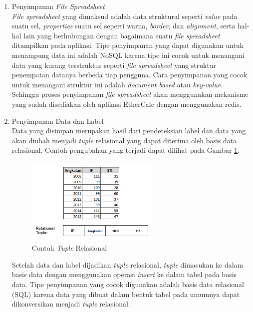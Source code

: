 	\begin{enumerate}
		\item Penyimpanan \textit{File Spreadsheet} \\
		\textit{File spreadsheet} yang dimaksud adalah data struktural seperti \textit{value} pada suatu sel, \textit{properties} suatu sel seperti warna, \textit{border}, dan \textit{alignment}, serta hal-hal lain yang berhubungan dengan bagaimana suatu \textit{file spreadsheet} ditampilkan pada aplikasi. Tipe penyimpanan yang dapat digunakan untuk menampung data ini adalah NoSQL karena tipe ini cocok untuk menangani data yang kurang terstruktur seperti \textit{file spreadsheet} yang struktur penempatan datanya berbeda tiap pengguna. Cara penyimpanan yang cocok untuk menangani struktur ini adalah \textit{document based} atau \textit{key-value}. Sehingga proses penyimpanan \textit{file spreadsheet} akan menggunakan mekanisme yang sudah disediakan oleh aplikasi EtherCalc dengan menggunakan redis.

		\item Penyimpanan Data dan Label \\
		Data yang disimpan merupakan hasil dari pendeteksian label dan data yang akan diubah menjadi \textit{tuple} relasional yang dapat diterima oleh basis data relasional. Contoh pengubahan yang terjadi dapat dilihat pada Gambar \ref{RelationalTuple}.

		\begin{figure}[htb]
		    \centering
		    \includegraphics[width=0.6\textwidth]{resources/chapter-3-relational-tuple.png}
		    \caption{Contoh \textit{Tuple} Relasional}
			\label{RelationalTuple}
		\end{figure}

		Setelah data dan label dijadikan \textit{tuple} relasional, \textit{tuple} dimasukan ke dalam basis data dengan menggunakan operasi \textit{insert} ke dalam tabel pada basis data. Tipe penyimpanan yang cocok digunakan adalah basis data relasional (SQL) karena data yang dibuat dalam bentuk tabel pada umumnya dapat dikonversikan menjadi \textit{tuple} relasional.
	\end{enumerate}

